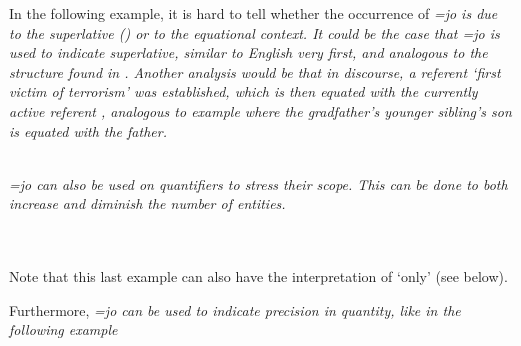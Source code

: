 In the following example, it is hard to tell whether the occurrence of \em =jo \em is due to the superlative () or to the equational context. It could be the case that \em =jo \em is used to indicate superlative, similar to English \em very first\em, and analogous to the structure found in . Another analysis would be that in discourse, a referent `first victim of terrorism' was established, which is then equated with the currently active referent , analogous to example  where the gradfather's younger sibling's son is equated with the father.

 \\


\em =jo \em can also be used on quantifiers to stress their scope. This can be done to both increase  and diminish  the number of entities.



\\  

\\ 

Note that this last example can also have the interpretation of `only' (see below).

Furthermore, \em =jo \em can be used to indicate precision in quantity, like in the following example

\\ 

